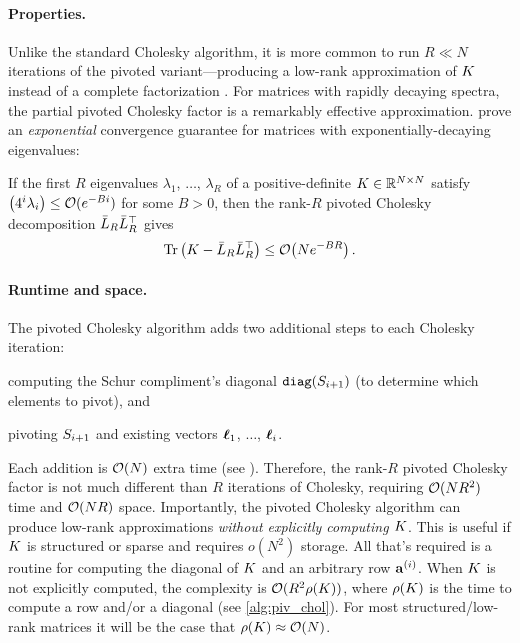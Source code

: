 \paragraph{Properties.}
Unlike the standard Cholesky algorithm, it is more common to run $R \ll N$ iterations of the pivoted variant---producing a low-rank approximation of $K$ instead of a complete factorization \cite{harbrecht2012low}.
For matrices with rapidly decaying spectra, the partial pivoted Cholesky factor is a remarkably effective approximation.
\citet{harbrecht2012low} prove an \emph{exponential} convergence guarantee for matrices with exponentially-decaying eigenvalues:
%
\begin{theorem}
\label{thm:harbrecht}
  If the first $R$ eigenvalues $\lambda_1$, $\ldots$, $\lambda_R$ of a positive-definite $K \in \mathbb{R}^{N \times N}$ satisfy $\left( 4^{i}\lambda_{i} \right) \leq \bigo{e^{-Bi}}$ for some $B>0$,
  then the rank-$R$ pivoted Cholesky decomposition $\bar{L}_{R} \bar{L}_R^\top$ gives
  \[
    \tr{\bK -  \bar\bL_R \bar\bL_R^\top} \leq \bigo{N e^{-BR}}.
  \]
\end{theorem}


\paragraph{Runtime and space.}
The pivoted Cholesky algorithm adds two additional steps to each Cholesky iteration:
%
\begin{enumerate*}
  \item computing the Schur compliment's diagonal $\texttt{diag}(S_{i+1})$ (to determine which elements to pivot), and
  \item pivoting $S_{i+1}$ and existing vectors $\boldsymbol{\ell}_1$, $\ldots$, $\boldsymbol{\ell}_i$.
\end{enumerate*}
%
Each addition is $\bigo{N}$ extra time (see \citep[][Thm. 1]{harbrecht2012low}).
Therefore, the rank-$R$ pivoted Cholesky factor is not much different than $R$ iterations of Cholesky, requiring $\bigo{N R^2}$ time and $\bigo{NR}$ space.
Importantly, the pivoted Cholesky algorithm can produce low-rank approximations \emph{without explicitly computing $K$}.
This is useful if $K$ is structured or sparse and requires $o(N^2)$ storage.
All that's required is a routine for computing the diagonal of $K$ and an arbitrary row $\mathbf{a}^{(i)}$.
When $K$ is not explicitly computed, the complexity is $\bigo{R^2 \row{\bK}}$, where $\rho ( K )$ is the time to compute a row and/or a diagonal (see \cref{alg:piv_chol}).
For most structured/low-rank matrices it will be the case that $\row{\bK} \approx \bigo{N}$.



\clearpage
